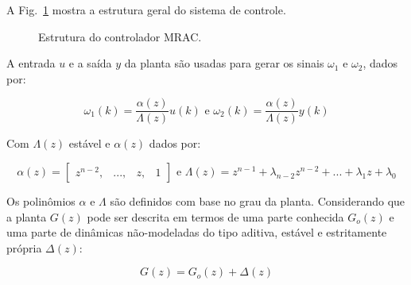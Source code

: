     A Fig.~\ref{fig:cascata} mostra a estrutura geral do sistema de controle.

    \begin{figure}[htb]
        \renewcommand\figurename{Fig.}
        \caption{Estrutura do controlador MRAC.}
        \label{fig:cascata}
    \end{figure}

    A entrada $u$ e a saída $y$ da planta são usadas para gerar os sinais $\omega_1$ e
    $\omega_2$, dados por:

    \begin{equation}
            \omega_1(k) = \frac{\alpha(z)}{\Lambda(z)} u(k) \text{ e }
            \omega_2(k) = \frac{\alpha(z)}{\Lambda(z)} y(k)
        \label{eq:omega_1_2}
    \end{equation}

    Com $\Lambda(z)$ estável e $\alpha(z)$ dados por:

    \begin{equation*}
        \alpha(z) = \left[ \begin{matrix} z^{n-2}, & ..., & z, & 1 \end{matrix} \right]
        \text{ e }
        \Lambda(z) = z^{n-1} + \lambda_{n-2} z^{n-2} + ... + \lambda_1 z + \lambda_0
    \end{equation*}

    Os polinômios $\alpha$ e $\Lambda$ são definidos com base no grau da planta.
    Considerando que a planta $G(z)$ pode ser descrita em termos de uma parte conhecida
    $G_o(z)$ e uma parte de dinâmicas não-modeladas do tipo aditiva, estável e estritamente
    própria $\Delta(z)$:

    \begin{equation}
        G(z) = G_o(z) + \Delta(z)
        \label{eq:planta_go_delta}
    \end{equation}

